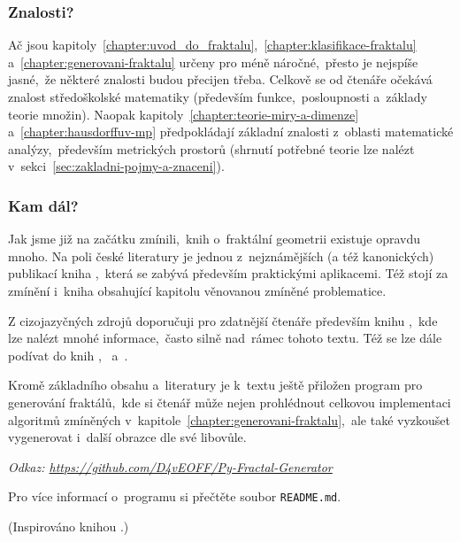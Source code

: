 \subsubsection{Znalosti?}

Ač jsou kapitoly~\ref{chapter:uvod_do_fraktalu},~\ref{chapter:klasifikace-fraktalu} a~\ref{chapter:generovani-fraktalu} určeny pro méně náročné,~přesto je nejspíše jasné,~že některé znalosti budou přecijen třeba. Celkově se od čtenáře očekává znalost středoškolské matematiky (především funkce,~posloupnosti a~základy teorie množin). Naopak kapitoly~\ref{chapter:teorie-miry-a-dimenze} a~\ref{chapter:hausdorffuv-mp} předpokládají základní znalosti z~oblasti matematické analýzy,~především metrických prostorů (shrnutí potřebné teorie lze nalézt v~sekci~\ref{sec:zakladni-pojmy-a-znaceni}).

\subsubsection{Kam dál?}

Jak jsme již na začátku zmínili,~knih o~fraktální geometrii existuje opravdu mnoho. Na poli české literatury je jednou z~nejznámějších (a též kanonických) publikací kniha \cite{Zelinka2006},~která se zabývá především praktickými aplikacemi. Též stojí za zmínění i~kniha \cite{Voracova2022} obsahující kapitolu věnovanou zmíněné problematice.

Z cizojazyčných zdrojů doporučuji pro zdatnější čtenáře především knihu \cite{Falconer1989},~kde lze nalézt mnohé informace,~často silně nad~rámec tohoto textu. Též se lze dále podívat do knih \cite{Prusinkiewicz1990},~\cite{Edgar2008} a~\cite{Mattila1995}.

Kromě základního obsahu a~literatury je k~textu ještě přiložen program pro generování fraktálů,~kde si čtenář může nejen prohlédnout celkovou implementaci algoritmů zmíněných v~kapitole~\ref{chapter:generovani-fraktalu},~ale také vyzkoušet vygenerovat i~další obrazce dle své libovůle.

\textit{Odkaz: \url{https://github.com/D4vEOFF/Py-Fractal-Generator}}

Pro více informací o~programu si přečtěte soubor \texttt{README.md}.

(Inspirováno knihou \cite{Hladik2019}.)